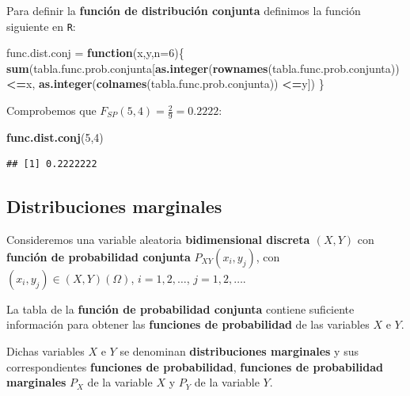 \documentclass[]{book}
\newenvironment{Shaded}{\begin{snugshade}}{\end{snugshade}}
\newcommand{\ControlFlowTok}[1]{\textcolor[rgb]{0.13,0.29,0.53}{\textbf{#1}}}
\newcommand{\DataTypeTok}[1]{\textcolor[rgb]{0.13,0.29,0.53}{#1}}
\newcommand{\DecValTok}[1]{\textcolor[rgb]{0.00,0.00,0.81}{#1}}
\newcommand{\KeywordTok}[1]{\textcolor[rgb]{0.13,0.29,0.53}{\textbf{#1}}}
\newcommand{\NormalTok}[1]{#1}
\newcommand{\OperatorTok}[1]{\textcolor[rgb]{0.81,0.36,0.00}{\textbf{#1}}}
\newcommand{\StringTok}[1]{\textcolor[rgb]{0.31,0.60,0.02}{#1}}
\begin{document}
Para definir la \textbf{función de distribución conjunta} definimos la función siguiente en \texttt{R}:

\begin{Shaded}
\begin{Highlighting}[]
\NormalTok{func.dist.conj =}\StringTok{ }\ControlFlowTok{function}\NormalTok{(x,y,}\DataTypeTok{n=}\DecValTok{6}\NormalTok{)\{}
  \KeywordTok{sum}\NormalTok{(tabla.func.prob.conjunta[}\KeywordTok{as.integer}\NormalTok{(}\KeywordTok{rownames}\NormalTok{(tabla.func.prob.conjunta))}\OperatorTok{<=}\NormalTok{x,}
                            \KeywordTok{as.integer}\NormalTok{(}\KeywordTok{colnames}\NormalTok{(tabla.func.prob.conjunta)) }\OperatorTok{<=}\NormalTok{y])}
\NormalTok{\}}
\end{Highlighting}
\end{Shaded}

Comprobemos que \(F_{SP}(5,4)=\frac{2}{9}=0.2222\):

\begin{Shaded}
\begin{Highlighting}[]
\KeywordTok{func.dist.conj}\NormalTok{(}\DecValTok{5}\NormalTok{,}\DecValTok{4}\NormalTok{)}
\end{Highlighting}
\end{Shaded}

\begin{verbatim}
## [1] 0.2222222
\end{verbatim}

\hypertarget{distribuciones-marginales}{%
\subsection{Distribuciones marginales}\label{distribuciones-marginales}}

Consideremos una variable aleatoria \textbf{bidimensional discreta \((X,Y)\)} con \textbf{función de probabilidad conjunta} \(P_{XY}(x_i,y_j)\), con \((x_i,y_j)\in (X,Y)(\Omega)\), \(i=1,2,\ldots\), \(j=1,2,\ldots\).

La tabla de la \textbf{función de probabilidad conjunta} contiene suficiente información para obtener las \textbf{funciones de probabilidad} de las variables \(X\) e \(Y\).

Dichas variables \(X\) e \(Y\) se denominan \textbf{distribuciones marginales} y sus correspondientes \textbf{funciones de probabilidad}, \textbf{funciones de probabilidad marginales} \(P_X\) de la variable \(X\) y \(P_Y\) de la variable \(Y\).
\end{document}
